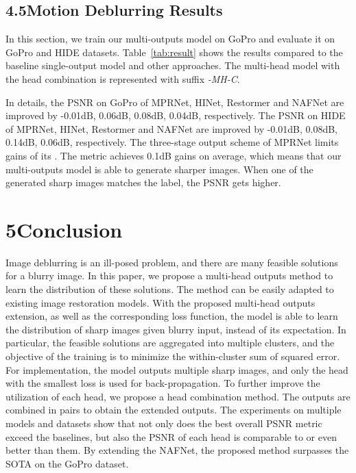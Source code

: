 \documentclass[letterpaper]{article} \usepackage{aaai23}  \usepackage{times}  \usepackage{helvet}  \usepackage{courier}  \usepackage[hyphens]{url}  \usepackage{graphicx} \urlstyle{rm} \def\UrlFont{\rm}  \usepackage{natbib}  \usepackage{caption} \frenchspacing  \setlength{\pdfpagewidth}{8.5in} \setlength{\pdfpageheight}{11in} \usepackage{algorithm}
\begin{document}
\subsection{4.5\quad Motion Deblurring Results}

In this section, we train our multi-outputs model on GoPro and evaluate it on GoPro and HIDE datasets. Table~\ref{tab:result} shows the results compared to the baseline single-output model and other approaches. The multi-head model with the head combination is represented with suffix \textit{-MH-C}. 

In details, the PSNR on GoPro of MPRNet, HINet, Restormer and NAFNet are improved by -0.01dB, 0.06dB, 0.08dB, 0.04dB, respectively. The PSNR on HIDE of MPRNet, HINet, Restormer and NAFNet are improved by -0.01dB, 0.08dB, 0.14dB, 0.06dB, respectively. The three-stage output scheme of MPRNet limits gains of its . The metric  achieves 0.1dB gains on average, which means that our multi-outputs model is able to generate sharper images. When one of the generated sharp images matches the label, the PSNR gets higher.

\section{5\quad Conclusion}

Image deblurring is an ill-posed problem, and there are many feasible solutions for a blurry image. In this paper, we propose a multi-head outputs method to learn the distribution of these solutions. The method can be easily adapted to existing image restoration models. With the proposed multi-head outputs extension, as well as the corresponding loss function, the model is able to learn the distribution of sharp images given blurry input, instead of its expectation. In particular, the feasible solutions are aggregated into multiple clusters, and the objective of the training is to minimize the within-cluster sum of squared error. For implementation, the model outputs multiple sharp images, and only the head with the smallest loss is used for back-propagation. To further improve the utilization of each head, we propose a head combination method. The outputs are combined in pairs to obtain the extended outputs. The experiments on multiple models and datasets show that not only does the best overall PSNR metric exceed the baselines, but also the PSNR of each head is comparable to or even better than them. By extending the NAFNet, the proposed method surpasses the SOTA on the GoPro dataset.




\end{document}
